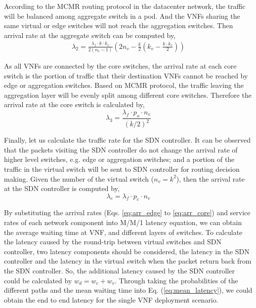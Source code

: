 According to the MCMR routing protocol in the datacenter network, the traffic will be balanced among aggregate switch in a pod. And the VNFs sharing the same virtual or edge switches will not reach the aggregation switches. Then arrival rate at the aggregate switch can be computed by,
\begin{equation}
\label{eq:arr_agg}
\begin{split}
\lambda _{ 2 }=\frac { { \lambda  }_{ f }\cdot k\cdot k_{ v } }{ 2({ n }_{ v }-1) } \left( 2{ n }_{ v }-\frac { k }{ 2 } \left( k_{ v }-\frac { k\cdot k_{ v } }{ 2 }  \right)  \right) 
\end{split}
\end{equation}

As all VNFs are connected by the core switches, the arrival rate at each core switch is the portion of traffic that their destination VNFs cannot be reached by edge or aggregation switches. Based on MCMR protocol, the traffic leaving the aggregation layer will be evenly split among different core switches. Therefore the arrival rate at the core switch is calculated by, 
\begin{equation}
\label{eq:arr_core}
\lambda _{ 3 }=\frac { { \lambda  }_{ f }\cdot p_{ o }\cdot { n }_{ v } }{ (k/2)^{ 2 } } 
\end{equation}

Finally, let us calculate the traffic rate for the SDN controller. It can be observed that the packets visiting the SDN controller do not change the arrival rate of higher level switches, e.g. edge or aggregation switches; and a portion of the traffic in the virtual switch will be sent to SDN controller for routing decision making. Given the number of the virtual switch ($n_v = k^2$), then the arrival rate at the SDN controller is computed by, 
\begin{equation}
\label{eq:arr_sdn}
\lambda _{ c }={ \lambda  }_{ f }\cdot p_{ c }\cdot { n }_{ v }
\end{equation}

By substituting the arrival rates (Eqs. \ref{eq:arr_edge} to \ref{eq:arr_core}) and service rates of each network component into M/M/1 latency equation, we can obtain the average waiting time at VNF, and different layers of switches. To calculate the latency caused by the round-trip between virtual switches and SDN controller, two latency components should be considered, the latency in the SDN controller and the latency in the virtual switch when the packet return back from the SDN controller. So, the additional latency caused by the SDN controller could be calculated by $w_{ d }={ w }_{ c }+w_{ v }$. Through taking the probabilities of the different paths and the mean waiting time into Eq. (\ref{eq:mean_latency}), we could obtain the end to end latency for the single VNF deployment scenario. 

